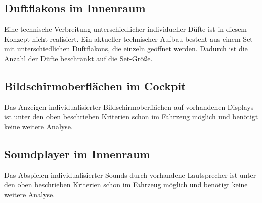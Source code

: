 \subsection{Duftflakons im Innenraum}
Eine technische Verbreitung unterschiedlicher individueller Düfte ist in diesem Konzept nicht realisiert. Ein aktueller technischer Aufbau besteht aus einem Set mit unterschiedlichen Duftflakons, die einzeln geöffnet werden. Dadurch ist die Anzahl der Düfte beschränkt auf die Set-Größe.
\subsection{Bildschirmoberflächen im Cockpit}
Das Anzeigen individualisierter Bildschirmoberflächen auf vorhandenen Displays ist unter den oben beschrieben Kriterien schon im Fahrzeug möglich und benötigt keine weitere Analyse.
\subsection{Soundplayer im Innenraum}
Das Abspielen individualisierter Sounds durch vorhandene Lautsprecher ist unter den oben beschrieben Kriterien schon im Fahrzeug möglich und benötigt keine weitere Analyse.
